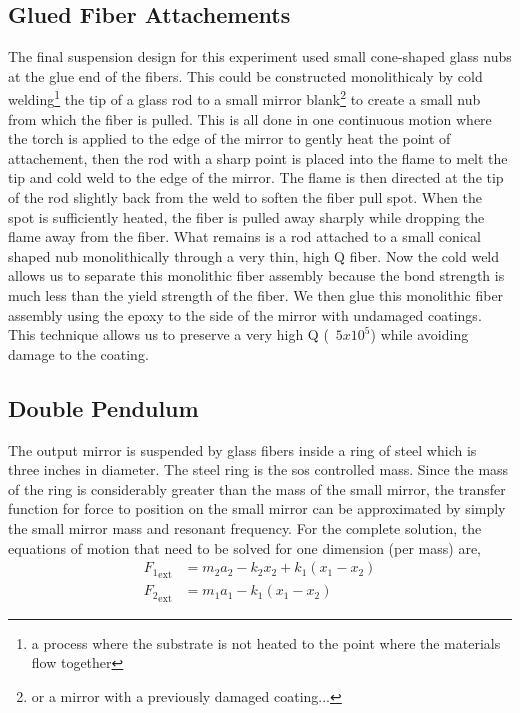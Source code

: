 \subsection{Glued Fiber Attachements}

The final suspension design for this experiment used small cone-shaped glass
nubs at the glue end of the fibers. This could be constructed monolithicaly
by cold welding\footnote{a process where the substrate is not heated to the
point where the materials flow together} the tip of a glass rod to a small
mirror blank\footnote{or a mirror with a previously damaged coating...} to
create a small nub from which the fiber is pulled. This is all done in one
continuous motion where the torch is applied to the edge of the mirror to
gently heat the point of attachement, then the rod with a sharp point is placed
into the flame to melt the tip and cold weld to the edge of the mirror. The
flame is then directed at the tip of the rod slightly back from the weld to
soften the fiber pull spot. When the spot is sufficiently heated, the fiber
is pulled away sharply while dropping the flame away from the fiber. What
remains is a rod attached to a small conical shaped nub monolithically through
a very thin, high Q fiber. Now the cold weld allows us to separate this
monolithic fiber assembly because the bond strength is much less than the yield
strength of the fiber. We then glue this monolithic fiber assembly using the
epoxy to the side of the mirror with undamaged coatings. This technique allows
us to preserve a very high Q (~$5x10^5$) while avoiding damage to the coating.

\subsection{Double Pendulum}
The output mirror is suspended by glass fibers inside a ring of steel which is
three inches in diameter. The steel ring is the \ac{sos} controlled mass.
Since the mass of the ring is considerably greater than the mass of the small
mirror, the transfer function for force to position on the small mirror can be
approximated by simply the small mirror mass and resonant frequency.
For the complete solution, the equations of motion that need to be solved for
one dimension (per mass) are,
\begin{align}
{F_1}_{\mathrm{ext}} &= m_2a_2-k_2x_2+k_1\left(x_1-x_2\right) \\
{F_2}_{\mathrm{ext}} &= m_1a_1-k_1\left(x_1-x_2\right)
\end{align}

